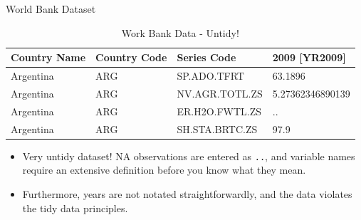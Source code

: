 \documentclass[10pt,ignorenonframetext,]{beamer}
\newenvironment{Shaded}{\begin{snugshade}}{\end{snugshade}}
\newcommand{\DataTypeTok}[1]{\textcolor[rgb]{0.13,0.29,0.53}{#1}}
\newcommand{\DecValTok}[1]{\textcolor[rgb]{0.00,0.00,0.81}{#1}}
\newcommand{\KeywordTok}[1]{\textcolor[rgb]{0.13,0.29,0.53}{\textbf{#1}}}
\newcommand{\NormalTok}[1]{#1}
\newcommand{\OperatorTok}[1]{\textcolor[rgb]{0.81,0.36,0.00}{\textbf{#1}}}
\newcommand{\OtherTok}[1]{\textcolor[rgb]{0.56,0.35,0.01}{#1}}
\newcommand{\StringTok}[1]{\textcolor[rgb]{0.31,0.60,0.02}{#1}}
\begin{document}
\begin{frame}[fragile]{World Bank Dataset}
\protect\hypertarget{world-bank-dataset-1}{}

\begin{Shaded}
\end{Shaded}

\begin{table}

\caption{\label{tab:unnamed-chunk-8}Work Bank Data - Untidy!}
\centering
\begin{tabular}[t]{llll}
\toprule
Country Name & Country Code & Series Code & 2009 [YR2009]\\
\midrule
\rowcolor{gray!6}  Argentina & ARG & SP.ADO.TFRT & 63.1896\\
Argentina & ARG & NV.AGR.TOTL.ZS & 5.27362346890139\\
\rowcolor{gray!6}  Argentina & ARG & ER.H2O.FWTL.ZS & ..\\
Argentina & ARG & SH.STA.BRTC.ZS & 97.9\\
\bottomrule
\end{tabular}
\end{table}

\begin{itemize}
\item
  Very untidy dataset! NA observations are entered as \texttt{..}, and
  variable names require an extensive definition before you know what
  they mean.
\item
  Furthermore, years are not notated straightforwardly, and the data
  violates the tidy data principles.
\end{itemize}

\end{frame}
\end{document}
